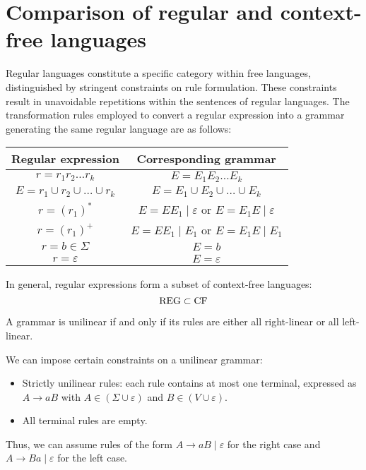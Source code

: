 \section{Comparison of regular and context-free languages}

Regular languages constitute a specific category within free languages, distinguished by stringent constraints on rule formulation.
These constraints result in unavoidable repetitions within the sentences of regular languages. 
The transformation rules employed to convert a regular expression into a grammar generating the same regular language are as follows:
\begin{table}[H]
    \centering
    \begin{tabular}{cc}
    \hline
    \textbf{Regular expression}         & \textbf{Corresponding grammar}                \\ \hline
    $r=r_1r_2\dots r_k$                 & $E=E_1E_2 \dots E_k$                          \\ 
    $E=r_1\cup r_2\cup \dots\cup r_k$   & $E=E_1 \cup E_2 \cup \dots \cup E_k$          \\
    $r=(r_1)^{\ast}$                       & $E=EE_1\mid \varepsilon$ or $E=E_1E\mid \varepsilon$  \\
    $r=(r_1)^{+}$                       & $E=EE_1\mid E_1$ or $E=E_1E\mid E_1$                  \\
    $r = b \in \Sigma$                  & $E=b$                                         \\
    $r=\varepsilon$                     & $E=\varepsilon$                               \\ \hline
    \end{tabular}
\end{table}
In general, regular expressions form a subset of context-free languages:
\[\textnormal{REG} \subset \textnormal{CF}\] 
\begin{definition}
    A grammar is unilinear if and only if its rules are either all right-linear or all left-linear.
\end{definition}
We can impose certain constraints on a unilinear grammar:
\begin{itemize}
    \item Strictly unilinear rules: each rule contains at most one terminal, expressed as $A \rightarrow aB$ with $A \in (\Sigma \cup \varepsilon)$ and $B \in (V \cup \varepsilon)$.
    \item All terminal rules are empty. 
\end{itemize}
Thus, we can assume rules of the form $A \rightarrow aB\mid \varepsilon$ for the right case and $A \rightarrow Ba\mid \varepsilon$ for the left case. 

